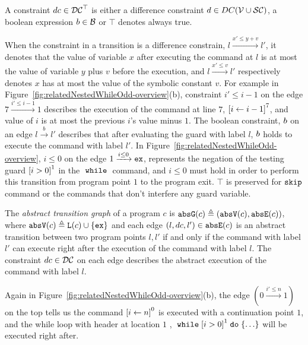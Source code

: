 \begin{defn}[Constraints]
A constraint $dc \in \mathcal{DC}^{\top}$
is either a
difference constraint $d \in DC(\mathcal{V}  \cup \mathcal{SC})$, a boolean expression $b \in \mathcal{B}$
or $\top$ denotes always true.
\end{defn}

When the constraint in a transition is a difference constrain, $l \xrightarrow{x' \leq y + v} l'$,
it denotes that
the value of variable $x$
after executing the command at $l$ is at most
the value of variable $y$ plus $v$ before the execution,
and $l \xrightarrow{x' \leq v} l'$ respectively denotes
$x$ has at most
the value of the symbolic constant $v$.
For example in Figure~\ref{fig:relatedNestedWhileOdd-overview}(b), constraint $i' \leq i - 1$ on the edge $7 \xrightarrow{i' \leq i - 1} 1$
describes the execution of
 the command at line $7$, 
$\clabel{\assign{i}{i - 1}}^{7}$, and value of $i$ is at most the previous $i$'s value minus $1$.
%
%
The boolean constraint, $b$ on an edge $l \xrightarrow{b} l'$ describes
that after evaluating the guard with label $l$,
$b$ holds to execute the command with label $l'$.
In Figure~\ref{fig:relatedNestedWhileOdd-overview}, $i \leq 0 $ on the edge $1 \xrightarrow{i \leq 0} \mathtt{ex}$, 
represents the negation of the testing guard $\clabel{i > 0}^1$
in the $\;\mathtt{while}\;$ command, and $i \leq 0$ must hold in order to perform this transition from program point $1$ to
the program exit. 
$\top$ is preserved for $\mathtt{skip}$ command or the commands that don't interfere any guard variable.

\begin{defn}
  \label{def:abs_cfg}
  The \emph{abstract transition graph} of a program $c$ is $\mathtt{abs}{\mathtt{G}}(c) \triangleq (\mathtt{abs}{\mathtt{V}}(c), \mathtt{abs}{\mathtt{E}}(c))$, where
  $\mathtt{abs}{\mathtt{V}}(c) \triangleq \mathtt{L}(c)\cup\{\mathtt{ex}\}$
  and 
  each edge $(l, dc, l') \in \mathtt{abs}{\mathtt{E}}(c)$ is an abstract transition
between two program points $l, l'$ if and only if
the command with label $l'$ can execute right after the execution of the command with label $l$.
The constraint $dc \in \mathcal{DC}$ on each edge
describes the abstract execution of the command with label $l$.
\end{defn}
Again in Figure~\ref{fig:relatedNestedWhileOdd-overview}(b),
the edge $(0 \xrightarrow{i' \leq n} 1)$ on the top tells us the command 
$\clabel{\assign{i}{n}}^0$ is executed with a continuation point $1$, and the while loop with header at location $1$ , $\ewhile \clabel{i > 0}^1 \edo \{\ldots\}$ will be executed right after.


